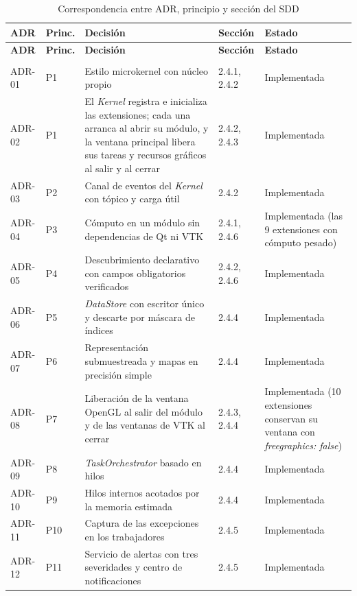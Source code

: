 \documentclass[12pt,letterpaper,oneside]{article}
\DeclareRobustCommand{\_}{\textunderscore\allowbreak}
\begin{document}
\begin{center}
\small
\begin{longtable}{|p{}|p{}|p{}|p{}|p{}|}
\hline
\textbf{ADR} & \textbf{Princ.} & \textbf{Decisión} & \textbf{Sección} & \textbf{Estado} \\
\hline
\endfirsthead
\hline
\textbf{ADR} & \textbf{Princ.} & \textbf{Decisión} & \textbf{Sección} & \textbf{Estado} \\
\hline
\endhead
\hline
\endfoot
\hline
\caption{Correspondencia entre ADR, principio y sección del SDD} \label{tab:sdd_traza_adr} \\
\endlastfoot

ADR-01 & P1 & Estilo microkernel con núcleo propio & 2.4.1, 2.4.2 & Implementada \\
\hline
ADR-02 & P1 & El \textit{Kernel} registra e inicializa las extensiones; cada una arranca al abrir su módulo, y la ventana principal libera sus tareas y recursos gráficos al salir y al cerrar & 2.4.2, 2.4.3 & Implementada \\
\hline
ADR-03 & P2 & Canal de eventos del \textit{Kernel} con tópico y carga útil & 2.4.2 & Implementada \\
\hline
ADR-04 & P3 & Cómputo en un módulo sin dependencias de Qt ni VTK & 2.4.1, 2.4.6 & Implementada (las 9 extensiones con cómputo pesado) \\
\hline
ADR-05 & P4 & Descubrimiento declarativo con campos obligatorios verificados & 2.4.2, 2.4.6 & Implementada \\
\hline
ADR-06 & P5 & \textit{DataStore} con escritor único y descarte por máscara de índices & 2.4.4 & Implementada \\
\hline
ADR-07 & P6 & Representación submuestreada y mapas en precisión simple & 2.4.4 & Implementada \\
\hline
ADR-08 & P7 & Liberación de la ventana OpenGL al salir del módulo y de las ventanas de VTK al cerrar & 2.4.3, 2.4.4 & Implementada (10 extensiones conservan su ventana con \textit{free\_graphics: false}) \\
\hline
ADR-09 & P8 & \textit{TaskOrchestrator} basado en hilos & 2.4.4 & Implementada \\
\hline
ADR-10 & P9 & Hilos internos acotados por la memoria estimada & 2.4.4 & Implementada \\
\hline
ADR-11 & P10 & Captura de las excepciones en los trabajadores & 2.4.5 & Implementada \\
\hline
ADR-12 & P11 & Servicio de alertas con tres severidades y centro de notificaciones & 2.4.5 & Implementada \\
\hline

\end{longtable}
\end{center}
\end{document}
